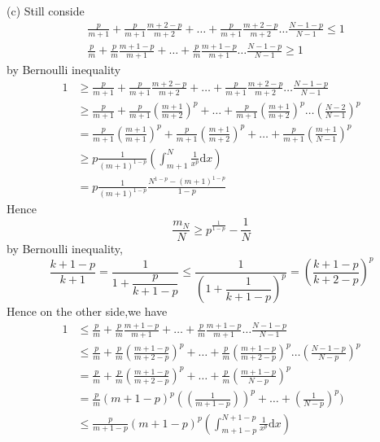\documentclass[a4paper,12pt]{article}
\newenvironment{prooff}{{\noindent\it\textcolor{cyan!40!black}{Proof}:}\quad}{\par}
\begin{document}
\begin{prooff}
    (c)  Still conside
    \begin{align*}
         & \frac{p}{m+1}+\frac{p}{m+1}\frac{m+2-p}{m+2}+\dots+\frac{p}{m+1}\frac{m+2-p}{m+2}\dots \frac{N-1-p}{N-1} \le 1 \\
         & \frac{p}{m}+\frac{p}{m}\frac{m+1-p}{m+1}+\dots+\frac{p}{m}\frac{m+1-p}{m+1}\dots \frac{N-1-p}{N-1} \ge 1
    \end{align*}
    by Bernoulli inequality
    \begin{align*}
        1 & \ge  \frac{p}{m+1}+\frac{p}{m+1}\frac{m+2-p}{m+2}+\dots+\frac{p}{m+1}\frac{m+2-p}{m+2}\dots \frac{N-1-p}{N-1}      \\
          & \ge \frac{p}{m+1}+\frac{p}{m+1}(\frac{m+1}{m+2})^p+\dots+\frac{p}{m+1}(\frac{m+1}{m+2})^p\dots (\frac{N-2}{N-1})^p \\
          & =\frac{p}{m+1}(\frac{m+1}{m+1})^p+\frac{p}{m+1}(\frac{m+1}{m+2})^p+\dots +\frac{p}{m+1}(\frac{m+1}{N-1})^p         \\
          & \ge p\frac{1}{(m+1)^{1-p}}(\int_{m+1}^{N}\frac{1}{x^p}\text{d}x)                                                   \\
          & = p\frac{1}{(m+1)^{1-p}}\frac{N^{1-p}-(m+1)^{1-p}}{1-p}
    \end{align*}
    Hence
    \begin{equation}
        \frac{m_N}{N}\ge p^{\frac{1}{1-p}}-\frac{1}{N}
    \end{equation}
    by Bernoulli inequality,
    \begin{equation*}
        \frac{k+1-p}{k+1}=\frac{1}{1+\dfrac{p}{k+1-p}}\le \frac{1}{(1+\dfrac{1}{k+1-p})^p}=(\frac{k+1-p}{k+2-p})^p
    \end{equation*}
    Hence on the other side,we have
    \begin{align*}
        1 & \le \frac{p}{m}+\frac{p}{m}\frac{m+1-p}{m+1}+\dots+\frac{p}{m}\frac{m+1-p}{m+1}\dots \frac{N-1-p}{N-1}                  \\
          & \le \frac{p}{m}+\frac{p}{m}(\frac{m+1-p}{m+2-p})^p+\dots +\frac{p}{m}(\frac{m+1-p}{m+2-p})^p\dots (\frac{N-1-p}{N-p})^p \\
          & =\frac{p}{m}+\frac{p}{m}(\frac{m+1-p}{m+2-p})^p+\dots +\frac{p}{m}(\frac{m+1-p}{N-p})^p                                 \\
          & =\frac{p}{m}(m+1-p)^p((\frac{1}{m+1-p}))^p+\dots+(\frac{1}{N-p})^p )                                                    \\
          & \le  \frac{p}{m+1-p}(m+1-p)^p(\int_{m+1-p}^{N+1-p}\frac{1}{x^p}\text{d}x)                                               \\

\end{align*}
\end{prooff}
\end{document}
